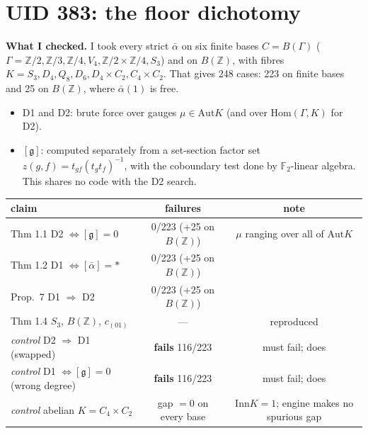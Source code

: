 \documentclass[10pt]{article}
\newcommand{\Z}{\mathbb{Z}}
\newcommand{\Inn}{\mathrm{Inn}}\newcommand{\Out}{\mathrm{Out}}\newcommand{\Aut}{\mathrm{Aut}}
\begin{document}
\section{UID 383: the floor dichotomy}
\textbf{What I checked.} I took every strict $\bar\alpha$ on six finite bases $C=B(\Gamma)$ ($\Gamma=\Z/2,\Z/3,\Z/4,V_4,\Z/2\times\Z/4,S_3$) and on $B(\Z)$, with fibres $K=S_3,D_4,Q_8,D_6,D_4\times C_2,C_4\times C_2$. That gives 248 cases: 223 on finite bases and 25 on $B(\Z)$, where $\bar\alpha(1)$ is free.
\begin{itemize}
\item D1 and D2: brute force over gauges $\mu\in\Aut K$ (and over $\mathrm{Hom}(\Gamma,K)$ for D2).
\item $[\mathfrak g]$: computed separately from a set-section factor set $z(g,f)=t_{gf}(t_gt_f)^{-1}$, with the coboundary test done by $\mathbb F_2$-linear algebra. This shares no code with the D2 search.
\end{itemize}
\begin{center}\small
\begin{tabular}{lcc}
\toprule
claim & failures & note\\\midrule
Thm 1.1 \;D2 $\iff[\mathfrak g]=0$ & 0/223 (+25 on $B(\Z)$) & $\mu$ ranging over all of $\Aut K$\\
Thm 1.2 \;D1 $\iff[\bar\alpha]=*$ & 0/223 (+25 on $B(\Z)$) & \\
Prop.~7 \;D1 $\Rightarrow$ D2 & 0/223 (+25 on $B(\Z)$) & \\
Thm 1.4 \;$S_3$, $B(\Z)$, $c_{(01)}$ & --- & reproduced\\\midrule
\emph{control} \;D2 $\Rightarrow$ D1 (swapped) & \textbf{fails} 116/223 & must fail; does\\
\emph{control} \;D1 $\iff[\mathfrak g]=0$ (wrong degree) & \textbf{fails} 116/223 & must fail; does\\
\emph{control} \;abelian $K=C_4\times C_2$ & gap $=0$ on every base & $\Inn K=1$; engine makes no spurious gap\\
\bottomrule
\end{tabular}
\end{center}
\end{document}
